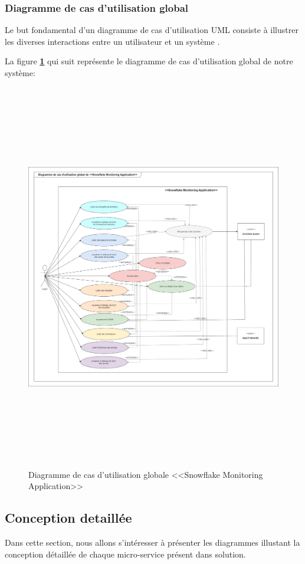     \subsubsection{Diagramme de cas d'utilisation global}
    \par Le but fondamental d'un diagramme de cas d'utilisation UML consiste à illustrer les diverses interactions entre un utilisateur et un système \cite{use_case}.
    \par  \par La figure \textbf{\ref{fig:use}} qui suit représente le diagramme de cas d'utilisation global de notre système:     
        \begin{figure}[H]
            \centering
            \includegraphics[width =1\linewidth, height=17cm]{img/conception/use_case.png}
            \caption{Diagramme de cas d'utilisation globale <<Snowflake Monitoring Application>>}
            \label{fig:use}
            \end{figure}
\subsection{Conception detaillée}
    \par Dans cette section, nous allons s'intéresser à présenter les diagrammes illustant la conception détaillée de chaque micro-service présent dans solution.
        
